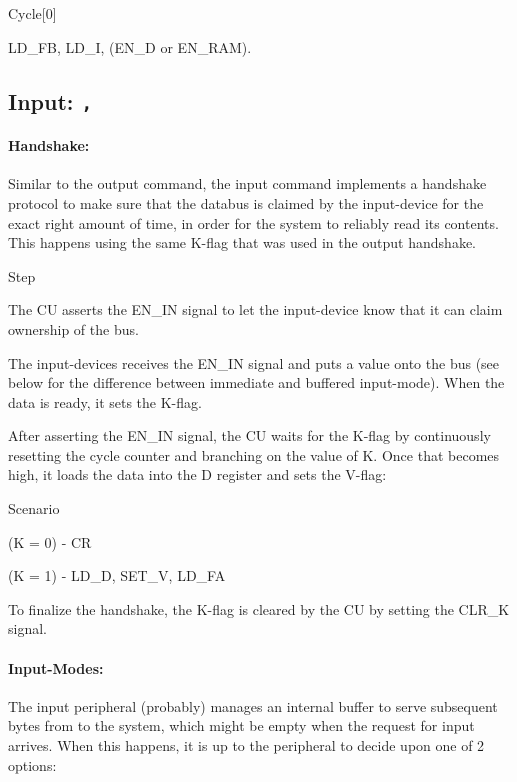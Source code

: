\begin{labeledenum}{Cycle}[0]
\item LD\_FB, LD\_I, (EN\_D or EN\_RAM).
\end{labeledenum}

\subsection{Input: \texttt{,}} \label{sec:sequences:input}
\paragraph{Handshake:} Similar to the output command, the input command implements a handshake protocol to make sure that the databus is claimed by the input-device for the exact right amount of time, in order for the system to reliably read its contents. This happens using the same K-flag that was used in the output handshake.

\begin{labeledenum}{Step}
\item The CU asserts the EN\_IN signal to let the input-device know that it can claim ownership of the bus.
\item The input-devices receives the EN\_IN signal and puts a value onto the bus (see below for the difference between immediate and buffered input-mode). When the data is ready, it sets the K-flag.
\item After asserting the EN\_IN signal, the CU waits for the K-flag by continuously resetting the cycle counter and branching on the value of K. Once that becomes high, it loads the data into the D register and sets the V-flag:

  \begin{labeledenum}{Scenario}
  \item (K = 0) -  CR
  \item (K = 1) - LD\_D, SET\_V, LD\_FA
  \end{labeledenum}
  
\item To finalize the handshake, the K-flag is cleared by the CU by setting the CLR\_K signal.  
\end{labeledenum}

\paragraph{Input-Modes:} The input peripheral (probably) manages an internal buffer to serve subsequent bytes from to the system, which might be empty when the request for input arrives. When this happens, it is up to the peripheral to decide upon one of 2 options:


